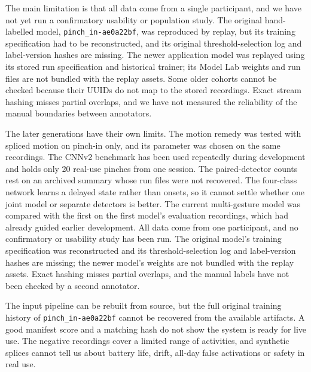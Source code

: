 
\label{limitations-and-reproducibility}

\iffull
The main limitation is that all data come from a single participant, and we have not yet run a confirmatory usability or population study. The original hand-labelled model, \nolinkurl{pinch_in-ae0a22bf}, was reproduced by replay, but its training specification had to be reconstructed, and its original threshold-selection log and label-version hashes are missing. The newer application model was replayed using its stored run specification and historical trainer; its Model Lab weights and run files are not bundled with the replay assets. Some older cohorts cannot be checked because their UUIDs do not map to the stored recordings. Exact stream hashing misses partial overlaps, and we have not measured the reliability of the manual boundaries between annotators.

The later generations have their own limits. The motion remedy was tested with spliced motion on pinch-in only, and its parameter was chosen on the same recordings. The CNNv2 benchmark has been used repeatedly during development and holds only 20 real-use pinches from one session. The paired-detector counts rest on an archived summary whose run files were not recovered. The four-class network learns a delayed state rather than onsets, so it cannot settle whether one joint model or separate detectors is better. The current multi-gesture model was compared with the first on the first model's evaluation recordings, which had already guided earlier development.
\else
All data come from one participant, and no confirmatory or usability study has been run. The original model's training specification was reconstructed and its threshold-selection log and label-version hashes are missing; the newer model's weights are not bundled with the replay assets. Exact hashing misses partial overlaps, and the manual labels have not been checked by a second annotator.
\fi

\iffull
The input pipeline can be rebuilt from source, but the full original training history of \nolinkurl{pinch_in-ae0a22bf} cannot be recovered from the available artifacts. A good manifest score and a matching hash do not show the system is ready for live use. The negative recordings cover a limited range of activities, and synthetic splices cannot tell us about battery life, drift, all-day false activations or safety in real use.
\fi

